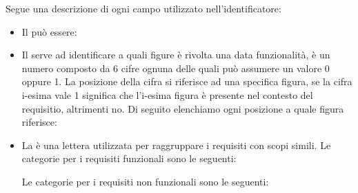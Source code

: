 \noindent
Segue una descrizione di ogni campo utilizzato nell'identificatore:
\begin{itemize}
	\item Il  può essere:

	\item Il  serve ad identificare a quali figure è rivolta una data funzionalità, è un numero composto da 6 cifre ognuna delle quali può assumere un valore 0 oppure 1. La posizione della cifra si riferisce ad una specifica figura, se la cifra i-esima vale 1 significa che l'i-esima figura è presente nel contesto del requisitio, altrimenti no.
	Di seguito elenchiamo ogni posizione a quale figura riferisce: 

	\item La  è una lettera utilizzata per raggruppare i requisiti con scopi simili.
	Le categorie per i requisiti funzionali sono le seguenti:
	Le categorie per i requisiti non funzionali sono le seguenti:


\end{itemize}
